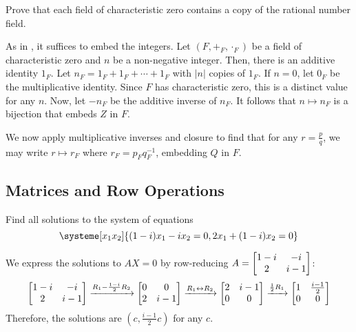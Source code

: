 \documentclass{agony}
\begin{document}
\begin{xca}
  Prove that each field of characteristic zero contains a copy of the rational number field.
\end{xca}
\begin{prf}
  As in , it suffices to embed the integers.
  Let $(F, +_F, \cdot_F)$ be a field of characteristic zero and $n$ be a non-negative integer.
  Then, there is an additive identity $1_F$.
  Let $n_F = 1_F + 1_F + \dotsb + 1_F$ with $|n|$ copies of $1_F$.
  If $n = 0$, let $0_F$ be the multiplicative identity.
  Since $F$ has characteristic zero, this is a distinct value for any $n$.
  Now, let $-n_F$ be the additive inverse of $n_F$.
  It follows that $n \mapsto n_F$ is a bijection that embeds $Z$ in $F$.

  We now apply multiplicative inverses and closure to find that for any $r = \frac{p}{q}$,
  we may write $r \mapsto r_F$ where $r_F = p_F q_F^{-1}$, embedding $Q$ in $F$.
\end{prf}

\subsection{Matrices and Row Operations}

\begin{xca}
  Find all solutions to the system of equations
  \[ \systeme[x_1x_2]{{(1-i)}x_1 - ix_2 = 0, 2x_1 + {(1-i)}x_2 = 0} \]
\end{xca}
\begin{sol}
  We express the solutions to $AX = 0$ by row-reducing $A = \mqty[1-i&-i\\2&i-1]$:
  \[
    \mqty[1-i&-i\\2&i-1]
    \xto{R_1 - \frac{1-i}{2}R_2} \mqty[0&0\\2&i-1]
    \xto{R_1 \harr R_2} \mqty[2&i-1\\0&0]
    \xto{\frac12 R_1} \mqty[1&\frac{i-1}{2}\\0&0]
  \]
  Therefore, the solutions are $(c, \frac{i-1}{2}c)$ for any $c$.
\end{sol}
\end{document}
